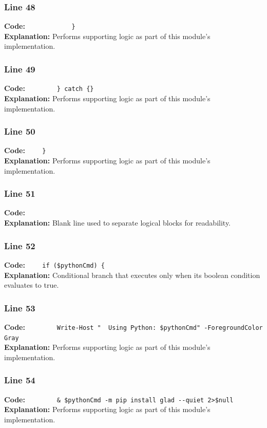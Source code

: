 \documentclass[11pt,a4paper]{article}
\begin{document}
\subsubsection*{Line 48}
\textbf{Code:} \verb|            }|\\
\textbf{Explanation:} Performs supporting logic as part of this module's implementation.

\subsubsection*{Line 49}
\textbf{Code:} \verb|        } catch {}|\\
\textbf{Explanation:} Performs supporting logic as part of this module's implementation.

\subsubsection*{Line 50}
\textbf{Code:} \verb|    }|\\
\textbf{Explanation:} Performs supporting logic as part of this module's implementation.

\subsubsection*{Line 51}
\textbf{Code:} \verb|    |\\
\textbf{Explanation:} Blank line used to separate logical blocks for readability.

\subsubsection*{Line 52}
\textbf{Code:} \verb|    if ($pythonCmd) {|\\
\textbf{Explanation:} Conditional branch that executes only when its boolean condition evaluates to true.

\subsubsection*{Line 53}
\textbf{Code:} \verb|        Write-Host "  Using Python: $pythonCmd" -ForegroundColor Gray|\\
\textbf{Explanation:} Performs supporting logic as part of this module's implementation.

\subsubsection*{Line 54}
\textbf{Code:} \verb|        & $pythonCmd -m pip install glad --quiet 2>$null|\\
\textbf{Explanation:} Performs supporting logic as part of this module's implementation.
\end{document}
